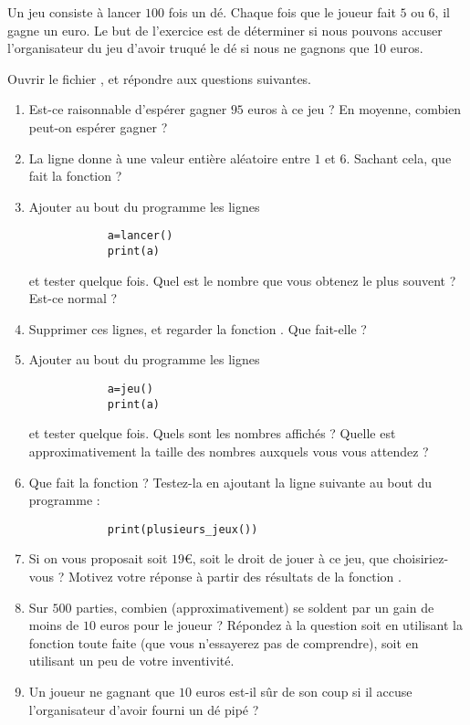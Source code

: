 
\begin{exercice}\label{exosmath-0338}

    Un jeu consiste à lancer \( 100\) fois un dé. Chaque fois que le joueur fait \( 5\) ou \( 6\), il gagne un euro. Le but de l'exercice est de déterminer si nous pouvons accuser l'organisateur du jeu d'avoir truqué le dé si nous ne gagnons que 10 euros.

    Ouvrir le fichier , et répondre aux questions suivantes.
    \begin{enumerate}
        \item
            Est-ce raisonnable d'espérer gagner \( 95\) euros à ce jeu ? En moyenne, combien peut-on espérer gagner ?
        \item
          La ligne  donne à  une valeur entière aléatoire entre \( 1\) et \( 6\). Sachant cela, que fait la fonction  ?
        \item
            Ajouter au bout du programme les lignes 
            \begin{verbatim}
            a=lancer()
            print(a)
            \end{verbatim}
            et tester quelque fois. Quel est le nombre que vous obtenez le plus souvent ? Est-ce normal ?
        \item
            Supprimer ces lignes, et regarder la fonction . Que fait-elle ? 
        \item
            Ajouter au bout du programme les lignes 
            \begin{verbatim}
            a=jeu()
            print(a)
            \end{verbatim}
            et tester quelque fois. Quels sont les nombres affichés ? Quelle est approximativement la taille des nombres auxquels vous vous attendez ?
        \item
            Que fait la fonction  ? Testez-la en ajoutant la ligne suivante au bout du programme :
            \begin{verbatim}
            print(plusieurs_jeux())
            \end{verbatim}
        \item
            Si on vous proposait soit \( 19\)€, soit le droit de jouer à ce jeu, que choisiriez-vous ? Motivez votre réponse à partir des résultats de la fonction .
        \item
            Sur \( 500\) parties, combien (approximativement) se soldent par un gain de moins de \( 10\) euros pour le joueur ? Répondez à la question soit en utilisant la fonction  toute faite (que vous n'essayerez pas de comprendre), soit en utilisant un peu de votre inventivité.
        \item
            Un joueur ne gagnant que \( 10\) euros est-il sûr de son coup si il accuse l'organisateur d'avoir fourni un dé pipé ?
    \end{enumerate}

\end{exercice}
